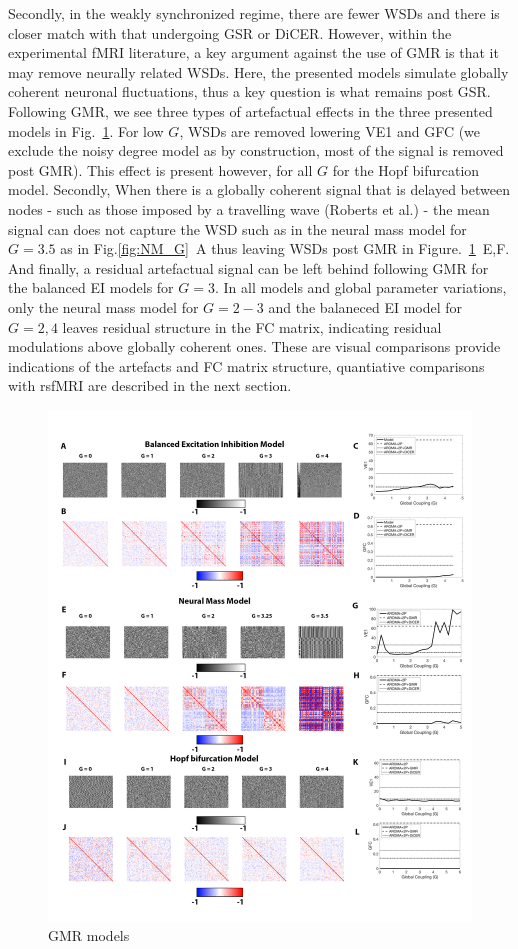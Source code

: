 \documentclass[oneside]{zHenriquesLab-StyleBioRxiv}
\begin{document}
Secondly, in the weakly synchronized regime, there are fewer WSDs and there is closer match with that undergoing GSR or DiCER. However, within the experimental fMRI literature, a key argument against the use of GMR is that it may remove neurally related WSDs. Here, the presented models simulate globally coherent neuronal fluctuations, thus a key question is what remains post GSR. Following GMR, we see three types of artefactual effects in the three presented models in Fig.~\ref{fig:GMRModels}. For low $G$, WSDs are removed lowering VE1 and GFC (we exclude the noisy degree model as by construction, most of the signal is removed post GMR). This effect is present however, for all $G$ for the Hopf bifurcation model. Secondly, When there is a globally coherent signal that is delayed between nodes - such as those imposed by a travelling wave (Roberts et al.) - the mean signal can does not capture the WSD such as in the neural mass model for $G=3.5$ as in Fig.\ref{fig:NM_G}~A thus leaving WSDs post GMR in Figure.~\ref{fig:GMRModels}~E,F. And finally, a residual artefactual signal can be left behind following GMR for the balanced EI models for $G=3$. In all models and global parameter variations, only the neural mass model for $G=2-3$ and the balaneced EI model for $G=2,4$ leaves residual structure in the FC matrix, indicating residual modulations above globally coherent ones. These are visual comparisons provide indications of the artefacts and FC matrix structure, quantiative comparisons with rsfMRI are described in the next section. 


\begin{figure}[ht!]
\includegraphics[width=1\textwidth]{figs/GMRModels.png}
\caption{GMR models}\label{fig:GMRModels}
\end{figure}
\end{document}
